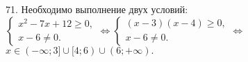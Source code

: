 71. Необходимо выполнение двух условий: $\begin{cases} x^2-7x+12\geqslant0,\\ x-6\neq0.\end{cases}\Leftrightarrow
\begin{cases} (x-3)(x-4)\geqslant0,\\ x-6\neq0.\end{cases}
\Leftrightarrow$\\$ x\in (-\infty;3]\cup[4;6)\cup(6;+\infty).$\\
